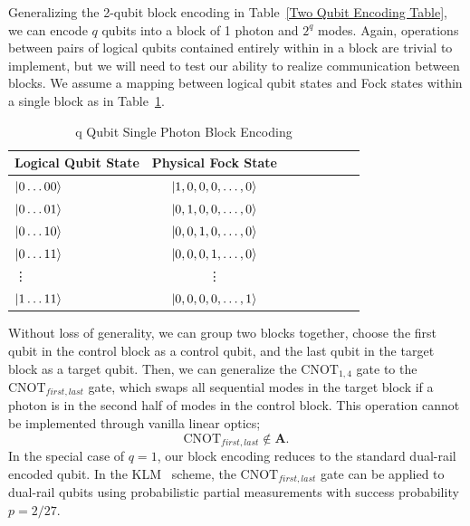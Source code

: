 \documentclass[aps,pra,twocolumn,showpacs,superscriptaddress,floatfix,10pt]{revtex4}
\begin{document}
Generalizing the 2-qubit block encoding in Table~\ref{Two Qubit Encoding Table}, we can encode $q$ qubits into a block of 1 photon and $2^q$ modes. Again, operations between pairs of logical qubits contained entirely within in a block are trivial to implement, but we will need to test our ability to realize communication between blocks. We assume a  mapping between logical qubit states and Fock states within a single block as in Table~\ref{q Qubit Block Encoding}.
\begin {table}[h]
\begin{center}
	\begin{tabular}{l*{6}{c}r} 
		Logical Qubit State      \quad \quad \quad     & Physical Fock State \\
		\hline 
		\quad \quad \quad $\ket{0\dots00}$     & $\ket{1,0,0,0,\dots,0}$ \\
		\quad \quad \quad $\ket{0\dots01}$            & $\ket{0,1,0,0,\dots,0}$ \\
		\quad \quad \quad $\ket{0\dots10}$            & $\ket{0,0,1,0,\dots,0}$ \\
		\quad \quad \quad $\ket{0\dots11}$            & $\ket{0,0,0,1,\dots,0}$ \\
		\quad \quad \quad \quad \enspace \vdots & \vdots \\
		\quad \quad \quad $\ket{1\dots11}$            & $\ket{0,0,0,0,\dots,1}$ \\
	\end{tabular}
	\caption{ \label{q Qubit Block Encoding} q Qubit Single Photon Block Encoding}
\end{center}
\end{table}
Without loss of generality, we can group two blocks together, choose the first qubit in the control block as a control qubit, and the last qubit in the target block as a target qubit. Then, we can generalize the $\mbox{CNOT}_{1,4}$ gate to the $\mbox{CNOT}_{first,last}$ gate, which swaps all sequential modes in the target block if a photon is in the second half of modes in the control block. This operation cannot be implemented through vanilla linear optics;
\begin{equation}
\mbox{CNOT}_{first,last} \notin \textbf{A}.
\end{equation}
In the special case of $q=1$, our block encoding reduces to the standard dual-rail encoded qubit\cite{Dual Rail}. In the KLM~\cite{KLM,Uskov} scheme, the $\mbox{CNOT}_{first,last}$ gate can be applied to dual-rail qubits using probabilistic partial measurements with success probability $p=2/27$. 
\end{document}

